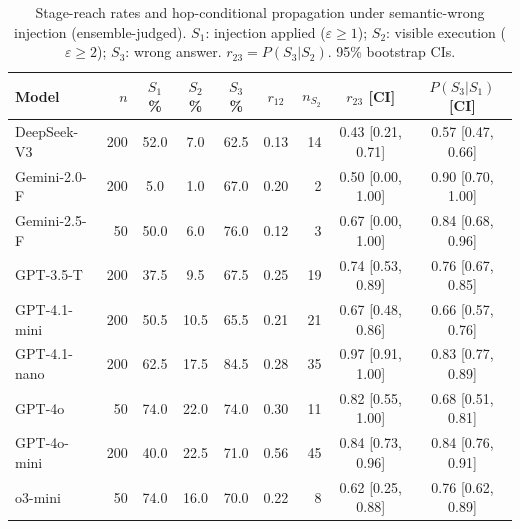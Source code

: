 \begin{table}[t]
\centering
\caption{Stage-reach rates and hop-conditional propagation under semantic-wrong injection (ensemble-judged). $S_1$: injection applied ($\varepsilon{\geq}1$); $S_2$: visible execution ($\varepsilon{\geq}2$); $S_3$: wrong answer. $r_{23}{=}P(S_3|S_2)$. 95\% bootstrap CIs.}
\label{tab:hop}
\scriptsize
\begin{tabular}{l r c c c c r c c}
\toprule
Model & $n$ & $S_1$\% & $S_2$\% & $S_3$\% & $r_{12}$ & $n_{S_2}$ & $r_{23}$ [CI] & $P(S_3|S_1)$ [CI] \\
\midrule
DeepSeek-V3 & 200 & 52.0 & 7.0 & 62.5 & 0.13 & 14 & 0.43 [0.21, 0.71] & 0.57 [0.47, 0.66] \\
Gemini-2.0-F & 200 & 5.0 & 1.0 & 67.0 & 0.20 & 2 & 0.50 [0.00, 1.00] & 0.90 [0.70, 1.00] \\
Gemini-2.5-F & 50 & 50.0 & 6.0 & 76.0 & 0.12 & 3 & 0.67 [0.00, 1.00] & 0.84 [0.68, 0.96] \\
GPT-3.5-T & 200 & 37.5 & 9.5 & 67.5 & 0.25 & 19 & 0.74 [0.53, 0.89] & 0.76 [0.67, 0.85] \\
GPT-4.1-mini & 200 & 50.5 & 10.5 & 65.5 & 0.21 & 21 & 0.67 [0.48, 0.86] & 0.66 [0.57, 0.76] \\
GPT-4.1-nano & 200 & 62.5 & 17.5 & 84.5 & 0.28 & 35 & 0.97 [0.91, 1.00] & 0.83 [0.77, 0.89] \\
GPT-4o & 50 & 74.0 & 22.0 & 74.0 & 0.30 & 11 & 0.82 [0.55, 1.00] & 0.68 [0.51, 0.81] \\
GPT-4o-mini & 200 & 40.0 & 22.5 & 71.0 & 0.56 & 45 & 0.84 [0.73, 0.96] & 0.84 [0.76, 0.91] \\
o3-mini & 50 & 74.0 & 16.0 & 70.0 & 0.22 & 8 & 0.62 [0.25, 0.88] & 0.76 [0.62, 0.89] \\
\bottomrule
\end{tabular}
\end{table}
